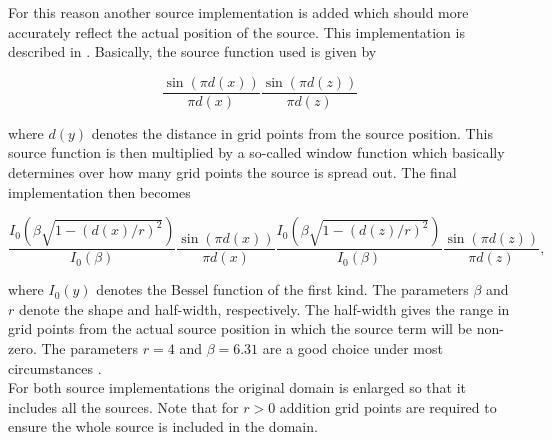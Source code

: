 \documentclass[10pt,a4paper]{article}
\begin{document}
For this reason another source implementation is added which should more accurately reflect the actual position of the source. This implementation is described in \cite{Hicks}. Basically, the source function used is given by

\begin{equation}
	\frac{\sin(\pi d(x))}{\pi d(x)}\frac{\sin(\pi d(z))}{\pi d(z)}
\end{equation}

where $d(y)$ denotes the distance in grid points from the source position. This source function is then multiplied by a so-called window function which basically determines over how many grid points the source is spread out. The final implementation then becomes

\begin{equation}
	\frac{I_0(\beta \sqrt{1-(d(x)/r)^2})}{I_0(\beta)}\frac{\sin(\pi d(x))}{\pi d(x)}\frac{I_0(\beta \sqrt{1-(d(z)/r)^2})}{I_0(\beta)}\frac{\sin(\pi d(z))}{\pi d(z)},
\end{equation}

where $I_0(y)$ denotes the Bessel function of the first kind. The parameters $\beta$ and $r$ denote the shape and half-width, respectively. The half-width gives the range in grid points from the actual source position in which the source term will be non-zero. The parameters $r=4$ and $\beta=6.31$ are a good choice under most circumstances \cite{Hicks}.\\

For both source implementations the original domain is enlarged so that it includes all the sources. Note that for $r>0$ addition grid points are required to ensure the whole source is included in the domain.
\end{document}
